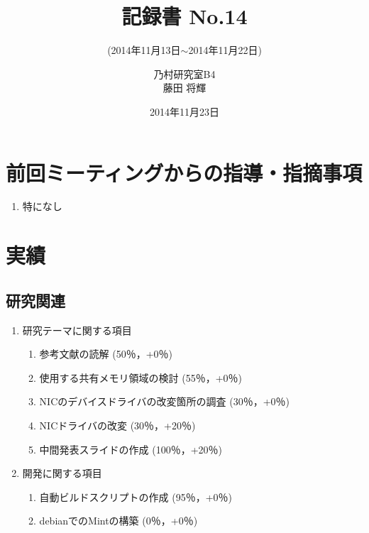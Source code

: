 \documentclass[fleqn, 14pt]{extarticle}
\subtitle{(2014年11月13日$\sim$2014年11月22日)}
\author{乃村研究室B4\\藤田 将輝}
\date{2014年11月23日}
\title{記録書 No.14}
\begin{document}
\maketitle




\section{前回ミーティングからの指導・指摘事項}
\label{sec-1}
\begin{enumerate}
\item 特になし
\newline
\hfill

\end{enumerate}




\section{実績}
\label{sec-2}

\subsection{研究関連}
\label{sec-2-1}
\begin{enumerate}
\item 研究テーマに関する項目
\hfill
\label{enum-research1}
\begin{enumerate}

\item 参考文献の読解
\hfill
\label{enum-1-A}
(50％，+0％)
\item 使用する共有メモリ領域の検討
\hfill
\label{enum-1-B}
(55％，+0％)
\item NICのデバイスドライバの改変箇所の調査
\hfill
\label{enum-1-C}
(30％，+0％)
\item NICドライバの改変
\hfill
\label{enum-1-D}
(30％，+20％)
\item 中間発表スライドの作成
\hfill
\label{enum-1-E}
(100％，+20％)
\end{enumerate}
\item 開発に関する項目
\hfill
\label{enum-research2}
\begin{enumerate}

\item 自動ビルドスクリプトの作成
\hfill
\label{enum-2-A}
(95％，+0％)
\item debianでのMintの構築
\hfill
\label{enum-2-A}
(0％，+0％)
\end{enumerate}




\end{enumerate}
\end{document}
